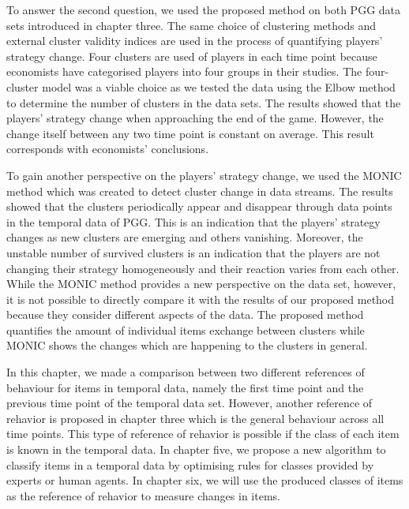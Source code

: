 To answer the second question, we used the proposed method on both PGG data sets introduced in chapter three. The same choice of clustering methods and external cluster validity indices are used in the process of quantifying players' strategy change. Four clusters are used of players in each time point because economists have categorised players into four groups in their studies. The four-cluster model was a viable choice as we tested the data using the Elbow method to determine the number of clusters in the data sets. The results showed that the players' strategy change when approaching the end of the game. However, the change itself between any two time point is constant on average. This result corresponds with economists' conclusions.


To gain another perspective on the players' strategy change, we used the MONIC method which was created to detect cluster change in data streams. The results showed that the clusters periodically appear and disappear through data points in the temporal data of PGG. This is an indication that the players' strategy changes as new clusters are emerging and others vanishing. Moreover, the unstable number of survived clusters is an indication that the players are not changing their strategy homogeneously and their reaction varies from each other. While the MONIC method provides a new perspective on the data set, however, it is not possible to directly compare it with the results of our proposed method because they consider different aspects of the data. The proposed method quantifies the amount of individual items exchange between clusters while MONIC shows the changes which are happening to the clusters in general.

In this chapter, we made a comparison between two different references of behaviour for items in temporal data, namely the first time point and the previous time point of the temporal data set. However, another reference of rehavior is proposed in chapter three which is the  general behaviour across all time points. This type of reference of rehavior is possible if the class of each item is known in the temporal data. In chapter five, we propose a new algorithm to classify items in a temporal data by optimising rules for classes provided by experts or human agents. In chapter six, we will use the produced classes of items as the reference of rehavior to measure changes in items.
